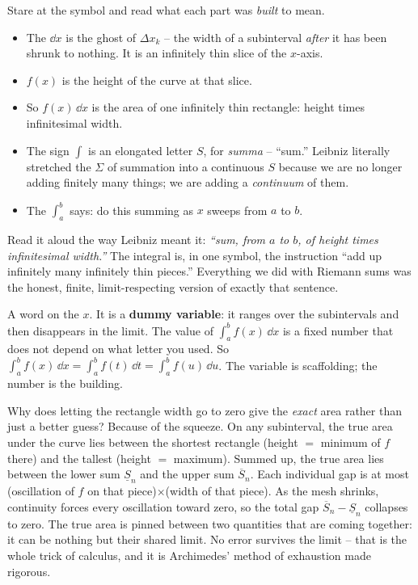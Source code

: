 \begin{happeningbox}
Stare at the symbol and read what each part was \emph{built} to mean.
\begin{itemize}
\item The $\dd x$ is the ghost of $\Delta x_k$ -- the width of a subinterval
\emph{after} it has been shrunk to nothing. It is an infinitely thin slice of the
$x$-axis.
\item $f(x)$ is the height of the curve at that slice.
\item So $f(x)\,\dd x$ is the area of one infinitely thin rectangle: height times
infinitesimal width.
\item The sign $\int$ is an elongated letter $S$, for \emph{summa} -- ``sum.''
Leibniz literally stretched the $\Sigma$ of summation into a continuous $S$
because we are no longer adding finitely many things; we are adding a
\emph{continuum} of them.
\item The $\int_a^b$ says: do this summing as $x$ sweeps from $a$ to $b$.
\end{itemize}
Read it aloud the way Leibniz meant it: \emph{``sum, from $a$ to $b$, of height
times infinitesimal width.''} The integral is, in one symbol, the instruction
``add up infinitely many infinitely thin pieces.'' Everything we did with
Riemann sums was the honest, finite, limit-respecting version of exactly that
sentence.
\end{happeningbox}

A word on the $x$. It is a \textbf{dummy variable}: it ranges over the
subintervals and then disappears in the limit. The value of $\int_a^b f(x)\,\dd
x$ is a fixed number that does not depend on what letter you used. So
$\int_a^b f(x)\,\dd x = \int_a^b f(t)\,\dd t = \int_a^b f(u)\,\dd u$. The
variable is scaffolding; the number is the building.

\begin{whybox}
Why does letting the rectangle width go to zero give the \emph{exact} area
rather than just a better guess? Because of the squeeze. On any subinterval, the
true area under the curve lies between the shortest rectangle (height $=$ minimum
of $f$ there) and the tallest (height $=$ maximum). Summed up, the true area lies
between the lower sum $\underline{S}_n$ and the upper sum $\overline{S}_n$. Each
individual gap is at most (oscillation of $f$ on that piece)$\times$(width of
that piece). As the mesh shrinks, continuity forces every oscillation toward
zero, so the total gap $\overline{S}_n - \underline{S}_n$ collapses to zero. The
true area is pinned between two quantities that are coming together: it can be
nothing but their shared limit. No error survives the limit -- that is the whole
trick of calculus, and it is Archimedes' method of exhaustion made rigorous.
\end{whybox}

